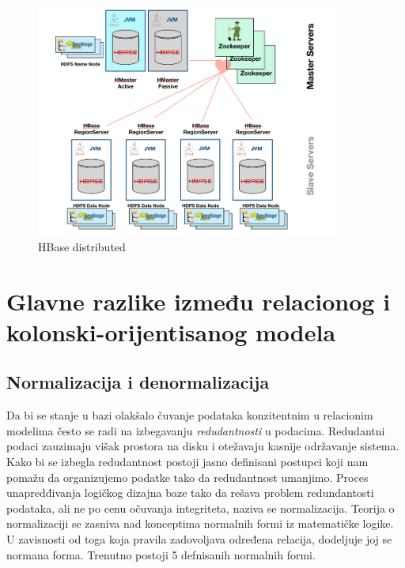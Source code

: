 \documentclass[12pt,oneside]{memoir}
\begin{document}
\begin{figure}[!ht]
  \centering
  \includegraphics[width=0.9\textwidth]{hbase-distributed.png}
  \caption{HBase distributed}
  \label{fig:grafikon}
\end{figure}


\pagebreak

\section{Glavne razlike između relacionog i kolonski-orijentisanog modela}


\subsection{Normalizacija i denormalizacija}

Da bi se stanje u bazi olakšalo čuvanje podataka konzitentnim u relacionim modelima često se radi na izbegavanju \textit{redudantnosti} u podacima. Redudantni podaci zauzimaju višak prostora na disku i otežavaju kasnije održavanje sistema. Kako bi se izbegla redudantnost postoji jasno definisani postupci koji nam pomažu da organizujemo podatke tako da redudantnost umanjimo. Proces unapredđivanja logičkog dizajna baze tako da rešava problem redundantosti podataka, ali ne po cenu očuvanja integriteta, naziva se normalizacija. Teorija o normalizaciji se zasniva nad konceptima normalnih formi iz matematičke logike. U zavisnosti od toga koja pravila zadovoljava određena relacija, dodeljuje joj se normana forma. Trenutno postoji 5 defnisanih normalnih formi. 
\end{document}
